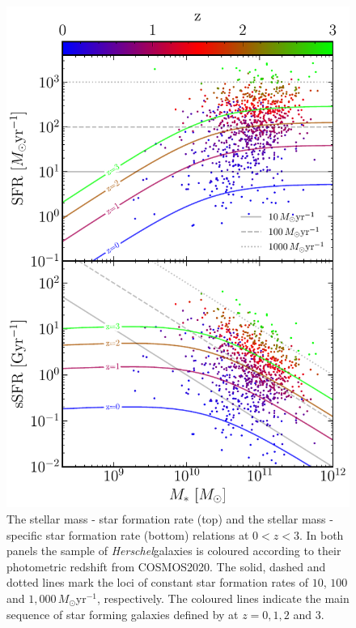 \begin{figure}
	\centering
	\includegraphics[width=0.8\columnwidth]{Figures/star_formation_ms.pdf}
	\caption[The $M_*$-SFR and $M_*$-sSFR planes of \textit{Herschel} galaxies between $0 < z < 3$]{The stellar mass - star formation rate (top) and the stellar mass - specific star formation rate (bottom) relations at $0 < z < 3$. In both panels the sample of \textit{Herschel}galaxies is coloured according to their photometric redshift from COSMOS2020. The solid, dashed and dotted lines mark the loci of constant star formation rates of $10$, $100$ and $1,000\,M_\odot$yr$^{-1}$, respectively. The coloured lines indicate the main sequence of star forming galaxies defined by \citealt{Scoville_2017} at $z = 0, 1, 2$ and $3$.}
	\label{fig:star_formation_ms}
\end{figure}


